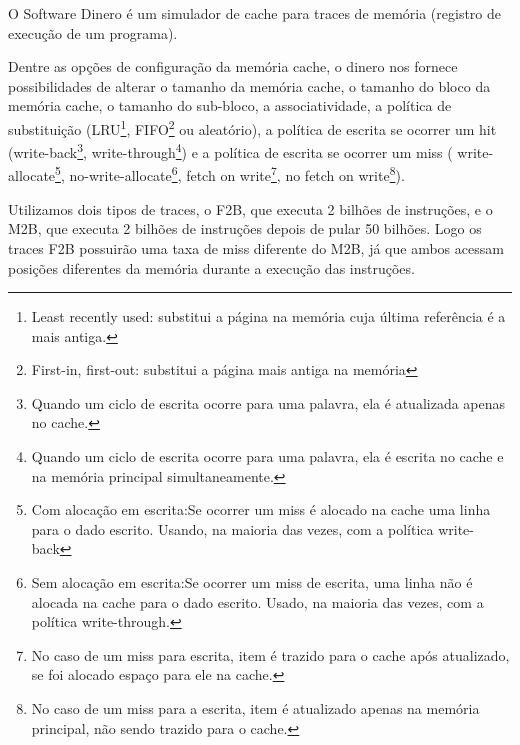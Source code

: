 \documentclass[10pt,a4paper]{article}
\begin{document}

O Software Dinero é um simulador de cache para traces de memória
(registro de execução de um programa).

Dentre as opções de configuração da memória cache, o dinero nos
fornece possibilidades de alterar o
tamanho da memória cache, o tamanho do bloco da memória
cache, o tamanho do sub-bloco, a associatividade, a política de
substituição (LRU\footnote{Least recently used: substitui a página na memória cuja última referência é a mais antiga.
}, FIFO\footnote{First-in, first-out: substitui a página mais antiga
  na memória} ou aleatório), a política de escrita se ocorrer um hit (write-back\footnote{Quando um ciclo de escrita ocorre para uma palavra, ela é atualizada
apenas no cache.}, write-through\footnote{Quando um ciclo de escrita ocorre para uma palavra, ela é escrita
no cache e na memória principal simultaneamente.}) e a política de escrita se ocorrer um
miss ( write-allocate\footnote{Com
  alocação em escrita:Se ocorrer um miss é alocado na cache
  uma linha para o dado escrito. Usando, na maioria das vezes, com a política write-back}, no-write-allocate\footnote{Sem
  alocação em escrita:Se ocorrer um miss de
  escrita, uma linha não é alocada na cache para o dado escrito. Usado, na maioria das vezes, com a política write-through.}, fetch on write\footnote{No caso de um miss para escrita, item é trazido
  para o cache após atualizado, se foi alocado espaço para ele na cache.}, no fetch on write\footnote{No caso de um miss para a  escrita, item é
  atualizado apenas na memória principal, não sendo trazido para o cache.}).

Utilizamos dois tipos de traces, o F2B, que executa 2 bilhões de
instruções, e o M2B, que executa 2 bilhões de instruções depois de pular
50 bilhões. Logo os traces F2B possuirão uma taxa de miss diferente do M2B, já que ambos
acessam posições diferentes da memória durante a execução das instruções. 

\end{document}

